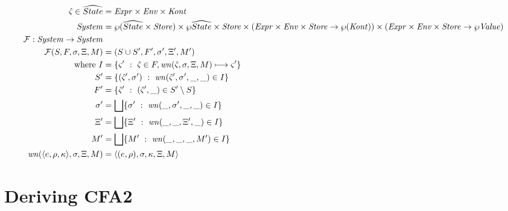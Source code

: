 \documentclass{llncs}
\begin{document}
\begin{align*}
  \hat\varsigma \in \widehat{State} &= \mathit{Expr} \times \mathit{Env} \times \mathit{Kont} \\
  \mathit{System} &= \wp(\widehat{State} \times \mathit{Store}) \times \wp{\widehat{State}} \times \mathit{Store} \times (\mathit{Expr} \times \mathit{Env} \times \mathit{Store} \to \wp(\mathit{Kont})) \times (\mathit{Expr} \times \mathit{Env} \times \mathit{Store} \to \wp{\mathit{Value}}) \\
  {\mathcal F} : \mathit{System} \to \mathit{System} \\
  {\mathcal F}(S, F, \sigma, \Xi, M) &= (S \cup S', F', \sigma', \Xi', M') \\
  \text{where } I &= \{ \varsigma'\ :\ \hat\varsigma \in F, \mathit{wn}(\hat\varsigma,\sigma,\Xi,M) \longmapsto \varsigma'\} \\
                S' &= \{ (\hat\varsigma',\sigma')\ :\ \mathit{wn}(\hat\varsigma', \sigma', \_, \_) \in I\} \\
                F' &= \{ \hat\varsigma'\ :\ (\hat\varsigma',\_) \in S' \setminus S\} \\
                \sigma' &= \bigsqcup\{ \sigma'\ :\ \mathit{wn}(\_, \sigma',\_,\_) \in I\} \\
                \Xi' &=  \bigsqcup\{ \Xi'\ :\ \mathit{wn}(\_, \_, \Xi', \_) \in I\} \\
                M' &=  \bigsqcup\{ M'\ :\ \mathit{wn}(\_, \_, \_, M') \in I\} \\
                \mathit{wn}(\langle e,\rho,\kappa \rangle,\sigma,\Xi,M) &= \langle (e,\rho),\sigma,\kappa,\Xi,M \rangle
\end{align*}

\section{Deriving CFA2}
\label{sec:cfa2}
\end{document}
